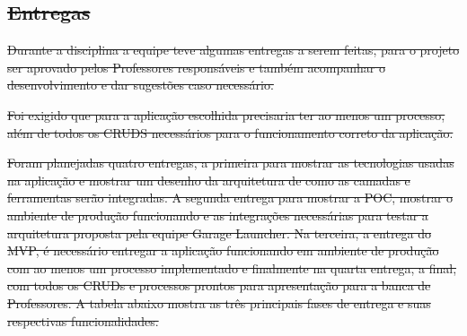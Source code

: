 \documentclass[
    12pt,               %
    openright,          %
    oneside,
    a4paper,            %
    paginasA3,  %
    BIBLATEX,           %
    REFINDENT,          %
    MODELO,             %
    TODO,               %
    english,            %
    brazil              %
    ]{ifsp-spo-inf-ctds} %
\providecommand{\DIFdel}[1]{{\protect\color{red}\sout{#1}}}                      %
\providecommand{\DIFdelbegin}{} %
\begin{document}
\begin{apendicesenv}
\DIFdelbegin \subsection{\DIFdel{Entregas}}
\addtocounter{subsection}{-1}%

\DIFdel{Durante a disciplina a equipe teve algumas entregas a serem feitas, para o projeto ser aprovado pelos Professores responsáveis e também acompanhar o desenvolvimento e dar sugestões caso necessário. 
}%

\DIFdel{Foi exigido que para a aplicação escolhida precisaria ter ao menos um processo, além de todos os CRUDS necessários para o funcionamento correto da aplicação. 
}%

\DIFdel{Foram planejadas quatro entregas, a primeira para mostrar as tecnologias usadas na aplicação e mostrar um desenho da arquitetura de como as camadas e ferramentas serão integradas. A segunda entrega para mostrar a POC, mostrar o ambiente de produção funcionando e as integrações necessárias para testar a arquitetura proposta pela equipe Garage Launcher. Na terceira, a entrega do MVP, é necessário entregar a aplicação funcionando em ambiente de produção com ao menos um processo implementado e finalmente na quarta entrega, a final, com todos os CRUDs e processos prontos para apresentação para a banca de Professores. A tabela abaixo mostra as três principais fases de entrega e suas respectivas funcionalidades.
}%



\end{apendicesenv}
\end{document}
